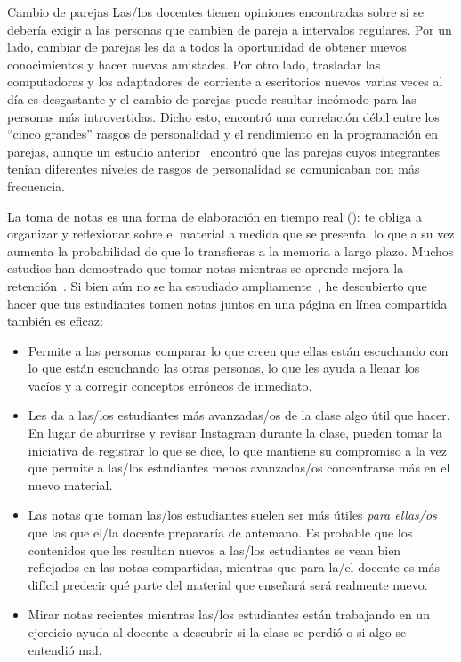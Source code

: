 \begin{aside}{Cambio de parejas}
  Las/los docentes tienen opiniones encontradas sobre si se debería exigir a las personas que cambien de pareja a intervalos regulares.
  Por un lado, cambiar de parejas les da a todos la oportunidad de obtener nuevos conocimientos y hacer nuevas amistades.
  Por otro lado,
  trasladar las computadoras y los adaptadores de corriente a escritorios nuevos varias veces al día es desgastante
  y el cambio de parejas puede resultar incómodo para las personas más introvertidas.
  Dicho esto,
  \cite{Hann2010} encontró una correlación débil entre los ``cinco grandes'' rasgos de personalidad 
  y el rendimiento en la programación en parejas,
  aunque un estudio anterior~\cite{Wall2009} encontró que
  las parejas cuyos integrantes tenían diferentes niveles de rasgos de personalidad se comunicaban con más frecuencia.
\end{aside}


La toma de notas es una forma de elaboración en tiempo real ():
te obliga a organizar y reflexionar sobre el material a medida que se presenta,
lo que a su vez aumenta la probabilidad de que lo transfieras a la memoria a largo plazo.
Muchos estudios han demostrado que
tomar notas mientras se aprende mejora la retención~\cite{Aike1975,Boha2011}.
Si bien aún no se ha estudiado ampliamente~\cite{Ornd2015,Yang2015},
he descubierto que hacer que tus estudiantes tomen notas juntos en una página en línea compartida también es eficaz:

\begin{itemize}

\item
  Permite a las personas comparar lo que creen que ellas están escuchando
  con lo que están escuchando las otras personas,
  lo que les ayuda a llenar los vacíos y a corregir conceptos erróneos de inmediato.
 
\item
  Les da a las/los estudiantes más avanzadas/os de la clase algo útil que hacer.
  En lugar de aburrirse y revisar Instagram durante la clase,
  pueden tomar la iniciativa de registrar lo que se dice,
  lo que mantiene su compromiso a la vez que
  permite a las/los estudiantes menos avanzadas/os concentrarse más en el nuevo material.
 
\item
  Las notas que toman las/los estudiantes suelen ser más útiles \emph{para ellas/os}
  que las que el/la docente prepararía de antemano.
  Es probable que los contenidos que les resultan nuevos a las/los estudiantes
  se vean bien reflejados en las notas compartidas,
  mientras que para la/el docente es más difícil predecir qué parte del material
  que enseñará será realmente nuevo.
  
\item
  Mirar notas recientes mientras las/los estudiantes están trabajando en un ejercicio
  ayuda al docente a descubrir si la clase se perdió o si algo se entendió mal.
 
\end{itemize}

